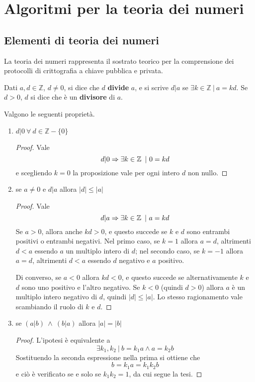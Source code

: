 \chapter{Algoritmi per la teoria dei numeri}\label{ch:numeri}
\section{Elementi di teoria dei numeri}
La teoria dei numeri rappresenta il sostrato teorico per la comprensione dei protocolli di crittografia a chiave pubblica e privata.

\begin{definizione}
Dati $a,d\in\mathbb{Z}$, $d\neq 0$, si dice che $d$ \textbf{divide} $a$, e si scrive $d|a$ se $\exists k\in\mathbb{Z}\ |\ a=kd$.
Se $d>0$, $d$ si dice che è un \textbf{divisore} di $a$.
\end{definizione}

\begin{proposizione}
Valgono le seguenti proprietà.
\begin{enumerate}
\item $d|0\ \forall\ d\in\mathbb{Z}-\{0\}$
\begin{proof}
Vale
\[
d|0 \Rightarrow \exists k\in\operatorname*{\mathbb{Z}}\ |\ 0=kd 
\]
e scegliendo $k=0$ la proposizione vale per ogni intero $d$ non nullo.
\end{proof}
\item se $a\neq 0$ e $d|a$ allora $|d| \leq |a|$
\begin{proof}
Vale
\[
d|a \Rightarrow \exists k\in\operatorname*{\mathbb{Z}}\ |\ a=kd
\]
Se $a>0$, allora anche $kd>0$, e questo succede se $k$ e $d$ sono entrambi positivi o entrambi negativi. Nel primo caso, se $k=1$ allora $a=d$, altrimenti $d<a$ essendo $a$ un multiplo intero di $d$; nel secondo caso, se $k=-1$ allora $a=d$, altrimenti $d<a$ essendo $d$ negativo e $a$ positivo.

Di converso, se $a<0$ allora $kd<0$, e questo succede se alternativamente $k$ e $d$ sono uno positivo e l'altro negativo. Se $k<0$ (quindi $d>0$) allora $a$ è un multiplo intero negativo di $d$, quindi $|d|\leq|a|$. Lo stesso ragionamento vale scambiando il ruolo di $k$ e $d$.
\end{proof}
\item se $(a|b)\ \land\ (b|a)$ allora $|a|=|b|$
\begin{proof}
L'ipotesi è equivalente a 
\[
\exists k_1,k_2\ |\ b=k_1a \land a=k_2b
\] 
Sostituendo la seconda espressione nella prima si ottiene che 
\[
b=k_1a=k_1k_2b
\]
e ciò è verificato se e solo se $k_1k_2=1$, da cui segue la tesi.
\end{proof}
\end{enumerate}
\end{proposizione}

